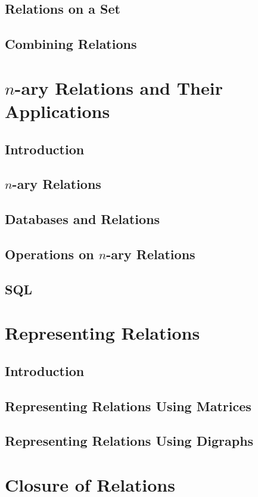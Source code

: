 \documentclass[11pt]{book}
\begin{document}
  \subsection{Relations on a Set}
  \subsection{Combining Relations}
  
 \section{$n$-ary Relations and Their Applications}
  \subsection{Introduction}
  \subsection{$n$-ary Relations}
  \subsection{Databases and Relations}
  \subsection{Operations on $n$-ary Relations}
  \subsection{SQL}
  
 \section{Representing Relations}
  \subsection{Introduction}
  \subsection{Representing Relations Using Matrices}
  \subsection{Representing Relations Using Digraphs}
  
 \section{Closure of Relations}
\end{document}
